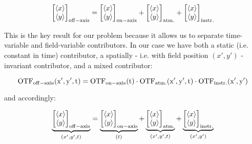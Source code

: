 \begin{equation}
\begin{bmatrix}
        \langle x \rangle \\ \langle y \rangle \end{bmatrix}_{\rm{off-axis}} = \begin{bmatrix} \langle x \rangle \\ \langle y \rangle\end{bmatrix}_{\rm{on-axis}} + \begin{bmatrix}\langle x \rangle \\ \langle y \rangle\end{bmatrix}_{\rm{atm.}} + \begin{bmatrix}\langle x \rangle \\ \langle y \rangle\end{bmatrix}_{\rm{instr.}}
\end{equation}

This is the key result for our problem because it allows us to separate time-variable and field-variable contributors. In our case we have both a static (i.e. constant in time) contributor, a spatially - i.e. with field position $(x',y')$ - invariant contributor, and a mixed contributor: 

\begin{equation}\label{dep}
\rm{OTF}_{\rm{off-axis}}(x',y',t)  =  \rm{OTF}_{\rm{on-axis}}(t)  \cdot  \rm{OTF}_{\rm{atm.}}(x',y',t)  \cdot  \rm{OTF}_{\rm{instr.}}(x',y')
\end{equation} 

and accordingly:

\begin{equation}
\underbrace{\begin{bmatrix}
        \langle x \rangle \\ \langle y \rangle \end{bmatrix}_{\rm{off-axis}}}_{(x',y',t)} = \underbrace{\begin{bmatrix} \langle x \rangle \\ \langle y \rangle\end{bmatrix}_{\rm{on-axis}}}_{(t)} + \underbrace{\begin{bmatrix}\langle x \rangle \\ \langle y \rangle\end{bmatrix}_{\rm{atm.}}}_{(x',y',t)} + \underbrace{\begin{bmatrix}\langle x \rangle \\ \langle y \rangle\end{bmatrix}_{\rm{instr.}}}_{(x',y')}
\end{equation}

